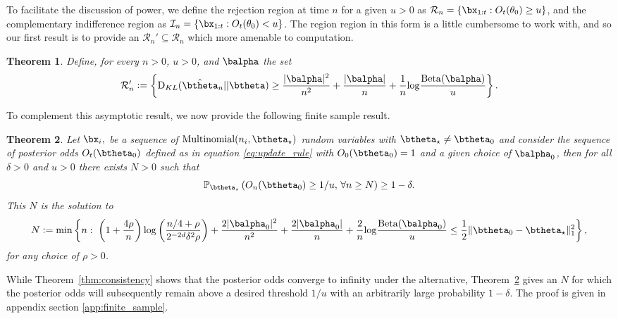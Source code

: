 \documentclass[11pt]{article}
\def\log{{\rm log}}
\newcommand{\Beta}{\mathrm{Beta}}
\newcommand{\KL}{\mathrm{D}_{KL}}
\newtheorem{thm}{Theorem}[section]
\newcommand{\df}{\vcentcolon=}
\newcommand{\pfrac}[2]{\left(\frac{#1}{#2}\right)}
\begin{document}
To facilitate the discussion of power, we define the rejection region at time $n$ for a given $u>0$ as $\mathcal{R}_n = \{ \bx_{1:t} : O_t(\theta_0) \geq u \}$,
and the complementary indifference region as $\mathcal{I}_n = \{ \bx_{1:t} : O_t(\theta_0) < u \}$. 
The region region in this form is a little cumbersome to work with,
and so our first result is to provide an $\mathcal R_n'\subseteq \mathcal R_n$ which more amenable to computation.

\begin{thm}\label{thm:calEprime}
  Define, for every $n>0$, $u>0$, and $\balpha$ the set
  \begin{equation}
    \label{eq:decision_boundary}
    \mathcal R_n'\df
    \left\{
      \KL(\hat\btheta_n|| \btheta)
      \geq
        \frac{|\balpha|^2}{n^2} + \frac{|\balpha|}{n}
      +\frac{1}{n}\log\frac{\Beta(\balpha)}{u}
    \right\}.
  \end{equation}
\end{thm}

To complement this asymptotic result, we now provide the following finite sample result.
\begin{thm}
  \label{thm:finite_sample}
\noindent Let $\bx_i,$ be a sequence of $\text{Multinomial}(n_i,\btheta_{\star})$ random variables with $\btheta_{\star} \neq \btheta_0$ and consider the sequence of posterior odds $O_t(\btheta_0)$ defined as in equation \eqref{eq:update_rule} with $O_0(\btheta_0)=1$ and a given choice of $\balpha_0$, then
for all $\delta > 0$ and $u > 0$ there exists $N > 0$ such that 
\begin{equation}
  \label{eq:finite_sample}
\mathbb{P}_{\btheta_{\star}}\left( O_n(\btheta_0) \geq 1/u, \, \forall n \geq N\right) \geq 1-\delta.
\end{equation}
This $N$ is the solution to 
\[
  N \df
  \min
  \left\{
    n:\;
      \left(1 + \frac{4\rho}{n}\right)
      \log\pfrac{n/4+\rho}{2^{-2d}\delta^2 \rho}
    +
      \frac{2|\balpha_0|^2}{n^2} + \frac{2|\balpha_0|}{n}
      +
    \frac{2}{n}\log\frac{\Beta(\balpha_0)}{u}
    \leq
    \frac{1}{2}\Vert \btheta_0- \btheta_{\star}\Vert_{1}^2
  \right\},
\] for any choice of $\rho > 0$. 
\end{thm}

While Theorem~\ref{thm:consistency} shows that the posterior odds converge to infinity under the alternative, Theorem~\ref{thm:finite_sample} gives an $N$
for which the posterior odds will subsequently remain above a desired threshold $1/u$ with an arbitrarily large probability $1-\delta$.
The proof is given in appendix section \ref{app:finite_sample}.
\end{document}
